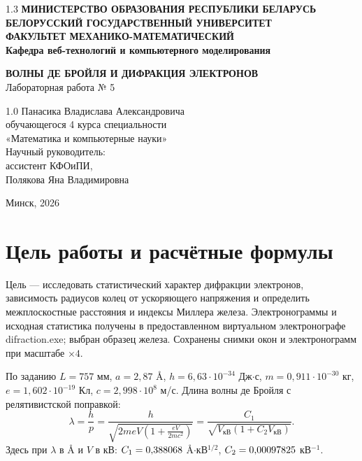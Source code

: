 \documentclass[12pt,a4paper]{article}
\begin{document}
\begin{titlepage}
\begin{center}
\begin{spacing}{1.3}
\textbf{МИНИСТЕРСТВО ОБРАЗОВАНИЯ РЕСПУБЛИКИ БЕЛАРУСЬ}\\[0.25cm]
\textbf{БЕЛОРУССКИЙ ГОСУДАРСТВЕННЫЙ УНИВЕРСИТЕТ}\\[0.25cm]
\textbf{ФАКУЛЬТЕТ МЕХАНИКО-МАТЕМАТИЧЕСКИЙ}\\[0.25cm]
\textbf{Кафедра веб-технологий и компьютерного моделирования}
\end{spacing}
\vspace{4.2cm}
\textbf{ВОЛНЫ ДЕ БРОЙЛЯ И ДИФРАКЦИЯ ЭЛЕКТРОНОВ}\\[0.4cm]
Лабораторная работа № 5
\end{center}
\vspace{3.6cm}
\noindent\hspace*{0.48\textwidth}\begin{minipage}{0.52\textwidth}
\begin{spacing}{1.0}
Панасика Владислава Александровича\\
обучающегося 4 курса специальности\\
«Математика и компьютерные науки»\\[0.6cm]
Научный руководитель:\\
ассистент КФОиПИ,\\
Полякова Яна Владимировна
\end{spacing}
\end{minipage}
\vfill
\begin{center}Минск, 2026\end{center}
\end{titlepage}
\setcounter{page}{2}
\tableofcontents
\clearpage

\section{Цель работы и расчётные формулы}
Цель --- исследовать статистический характер дифракции электронов,
зависимость радиусов колец от ускоряющего напряжения и определить
межплоскостные расстояния и индексы Миллера железа.
Электронограммы и исходная статистика получены в предоставленном
виртуальном электронографе difraction.exe; выбран образец железа.
Сохранены снимки окон и электронограмм при масштабе $\times4$.

По заданию $L=757$ мм, $a=2{,}87$ \AA{},
$h=6{,}63\cdot10^{-34}$ Дж$\cdot$с,
$m=0{,}911\cdot10^{-30}$ кг,
$e=1{,}602\cdot10^{-19}$ Кл, $c=2{,}998\cdot10^8$ м/с.
Длина волны де Бройля с релятивистской поправкой:
\begin{equation}
 \lambda=\frac hp=
 \frac{h}{\sqrt{2meV\left(1+\frac{eV}{2mc^2}\right)}}
 =\frac{C_1}{\sqrt{V_{\mathrm{кВ}}(1+C_2V_{\mathrm{кВ}})}}.
\end{equation}
Здесь при $\lambda$ в \AA{} и $V$ в кВ:
$C_1=0{,}388068$ \AA$\cdot$кВ$^{1/2}$,
$C_2=0{,}00097825$ кВ$^{-1}$.
\end{document}
